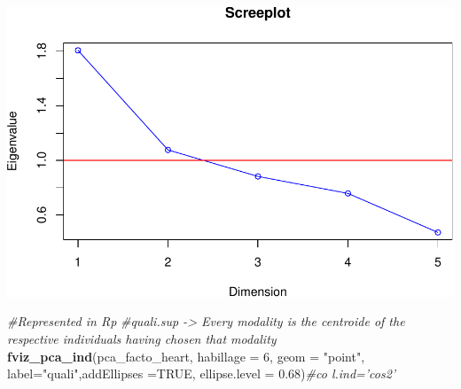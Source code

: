 \documentclass[]{article}
\newenvironment{Shaded}{\begin{snugshade}}{\end{snugshade}}
\newcommand{\KeywordTok}[1]{\textcolor[rgb]{0.13,0.29,0.53}{\textbf{#1}}}
\newcommand{\DataTypeTok}[1]{\textcolor[rgb]{0.13,0.29,0.53}{#1}}
\newcommand{\DecValTok}[1]{\textcolor[rgb]{0.00,0.00,0.81}{#1}}
\newcommand{\FloatTok}[1]{\textcolor[rgb]{0.00,0.00,0.81}{#1}}
\newcommand{\StringTok}[1]{\textcolor[rgb]{0.31,0.60,0.02}{#1}}
\newcommand{\CommentTok}[1]{\textcolor[rgb]{0.56,0.35,0.01}{\textit{#1}}}
\newcommand{\OtherTok}[1]{\textcolor[rgb]{0.56,0.35,0.01}{#1}}
\newcommand{\OperatorTok}[1]{\textcolor[rgb]{0.81,0.36,0.00}{\textbf{#1}}}
\newcommand{\NormalTok}[1]{#1}
\begin{document}
\begin{Shaded}
\end{Shaded}

\includegraphics{project_report_files/figure-latex/unnamed-chunk-8-2.pdf}

\begin{Shaded}
\begin{Highlighting}[]
\CommentTok{#Represented in Rp}
\CommentTok{#quali.sup -> Every modality is the centroide of the respective individuals having chosen that modality}
\KeywordTok{fviz_pca_ind}\NormalTok{(pca_facto_heart, }\DataTypeTok{habillage =} \DecValTok{6}\NormalTok{, }\DataTypeTok{geom =} \StringTok{"point"}\NormalTok{, }\DataTypeTok{label=}\StringTok{"quali"}\NormalTok{,}\DataTypeTok{addEllipses =}\OtherTok{TRUE}\NormalTok{, }\DataTypeTok{ellipse.level =} \FloatTok{0.68}\NormalTok{)}\CommentTok{#co l.ind='cos2'}
\end{Highlighting}
\end{Shaded}
\end{document}
